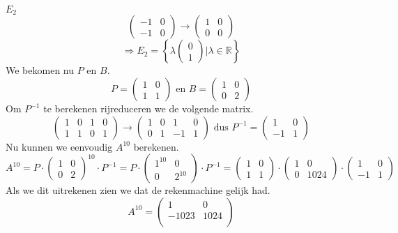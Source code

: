 \documentclass[lineaire_algebra_oplossingen.tex]{subfiles}
\begin{document}
\emph{$E_2$}\\
\[
\begin{pmatrix}
-1 & 0\\
-1 & 0
\end{pmatrix}
\rightarrow
\begin{pmatrix}
1 & 0\\
0 & 0
\end{pmatrix}
\]
\[
\Rightarrow
E_2 =
\left\{
\lambda
\begin{pmatrix}
0\\1
\end{pmatrix}
| \lambda \in \mathbb{R}
\right\}
\]
We bekomen nu $P$ en $B$.
\[
P = 
\begin{pmatrix}
1 & 0\\
1 & 1
\end{pmatrix}
\text{ en }
B = 
\begin{pmatrix}
1 & 0\\
0 & 2
\end{pmatrix}
\]
Om $P^{-1}$ te berekenen rijreduceren we de volgende matrix.
\[
\begin{pmatrix}
1 & 0 & 1 & 0\\
1 & 1 & 0 & 1
\end{pmatrix}
\rightarrow
\begin{pmatrix}
1 & 0 & 1 & 0\\
0 & 1 & -1 & 1
\end{pmatrix}
\text{ dus }
P^{-1} = 
\begin{pmatrix}
1 & 0\\
-1 & 1
\end{pmatrix}
\]
Nu kunnen we eenvoudig $A^{10}$ berekenen.
\[
A^{10}=
P
\cdot
\begin{pmatrix}
1 & 0\\
0 & 2
\end{pmatrix}^{10}
\cdot 
P^{-1}
=
P
\cdot
\begin{pmatrix}
1^{10} & 0\\
0 & 2^{10}
\end{pmatrix}
\cdot 
P^{-1}
=
\begin{pmatrix}
1 & 0\\
1 & 1
\end{pmatrix}
\cdot
\begin{pmatrix}
1 & 0\\
0 & 1024
\end{pmatrix}
\cdot 
\begin{pmatrix}
1 & 0\\
-1 & 1
\end{pmatrix}
\]
Als we dit uitrekenen zien we dat de rekenmachine gelijk had.
\[
A^{10}=
\begin{pmatrix}
1 & 0\\
-1023 & 1024\\
\end{pmatrix}
\]
\end{document}
